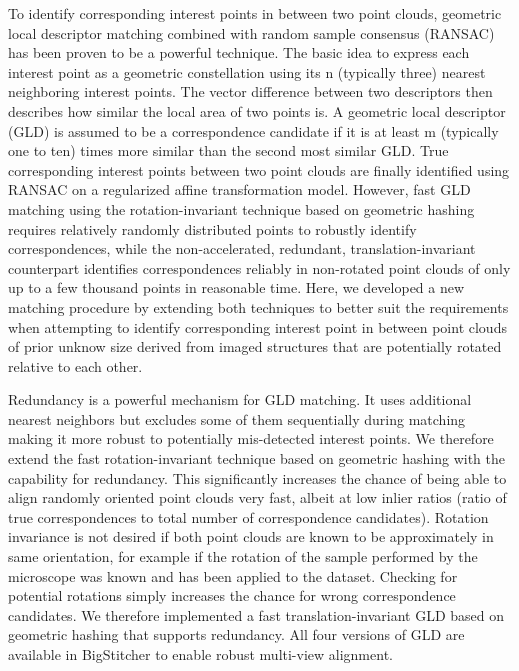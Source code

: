 To identify corresponding interest points in between two point clouds, geometric local descriptor matching combined with random sample consensus (RANSAC\cite{ransac}) has been proven to be a powerful technique\cite{beads,descriptor}. The basic idea to express each interest point as a geometric constellation using its n (typically three) nearest neighboring interest points. The vector difference between two descriptors then describes how similar the local area of two points is. A geometric local descriptor (GLD) is assumed to be a correspondence candidate if it is at least m (typically one to ten) times more similar than the second most similar GLD\cite{lowe2004distinctive}. True corresponding interest points between two point clouds are finally identified using RANSAC on a regularized affine transformation model. However, fast GLD matching using the rotation-invariant technique based on geometric hashing\cite{beads} requires relatively randomly distributed points to robustly identify correspondences, while the non-accelerated, redundant, translation-invariant counterpart\cite{descriptor} identifies correspondences reliably in non-rotated point clouds of only up to a few thousand points in reasonable time. Here, we developed a new matching procedure by extending both techniques to better suit the requirements when attempting to identify corresponding interest point in between point clouds of prior unknow size derived from imaged structures that are potentially rotated relative to each other.

Redundancy is a powerful mechanism for GLD matching. It uses additional nearest neighbors but excludes some of them sequentially during matching making it more robust to potentially mis-detected interest points\cite{descriptor}. We therefore extend the fast rotation-invariant technique based on geometric hashing\cite{beads} with the capability for redundancy. This significantly increases the chance of being able to align randomly oriented point clouds very fast, albeit at low inlier ratios (ratio of true correspondences to total number of correspondence candidates). Rotation invariance is not desired if both point clouds are known to be approximately in same orientation, for example if the rotation of the sample performed by the microscope was known and has been applied to the dataset. Checking for potential rotations simply increases the chance for wrong correspondence candidates. We therefore implemented a fast translation-invariant GLD based on geometric hashing that supports redundancy. All four versions of GLD are available in BigStitcher to enable robust multi-view alignment.

